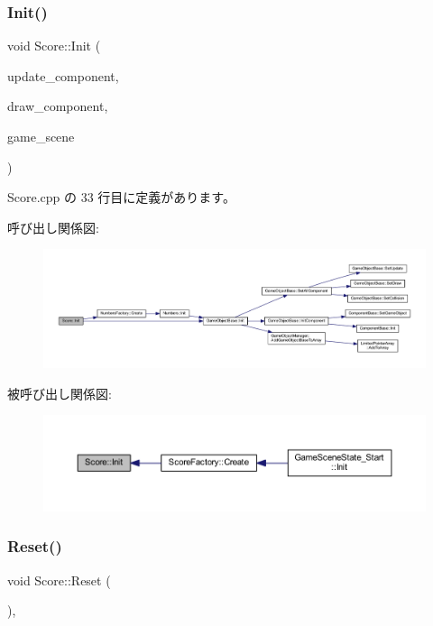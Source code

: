 \subsubsection{\texorpdfstring{Init()}{Init()}}
{\footnotesize\ttfamily void Score\+::\+Init (\begin{DoxyParamCaption}\item[{\mbox{\hyperlink{class_update_base}{Update\+Base}} $\ast$}]{update\+\_\+component,  }\item[{\mbox{\hyperlink{class_draw_base}{Draw\+Base}} $\ast$}]{draw\+\_\+component,  }\item[{\mbox{\hyperlink{class_game_scene}{Game\+Scene}} $\ast$}]{game\+\_\+scene }\end{DoxyParamCaption})}



 Score.\+cpp の 33 行目に定義があります。

呼び出し関係図\+:\nopagebreak
\begin{figure}[H]
\begin{center}
\leavevmode
\includegraphics[width=350pt]{class_score_a7d461a8b72ddfd00213858286d702486_cgraph}
\end{center}
\end{figure}
被呼び出し関係図\+:\nopagebreak
\begin{figure}[H]
\begin{center}
\leavevmode
\includegraphics[width=350pt]{class_score_a7d461a8b72ddfd00213858286d702486_icgraph}
\end{center}
\end{figure}
\mbox{\label{class_score_ad01d461a2b6ca345858b2ae0a3d81cc1}} 
\subsubsection{\texorpdfstring{Reset()}{Reset()}}
{\footnotesize\ttfamily void Score\+::\+Reset (\begin{DoxyParamCaption}{ }\end{DoxyParamCaption})\hspace{0.3cm}{\ttfamily [override]}, {\ttfamily [virtual]}}



